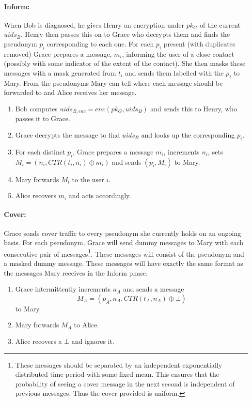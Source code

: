 \documentclass{article}
\begin{document}
\paragraph{Inform:}
When Bob is diagnosed, he gives Henry an encryption under $pk_G$ of the current $uids_B$. Henry then passes this on to Grace who decrypts them and finds the pseudonym $p_i$ corresponding to each one. For each $p_i$ present (with duplicates removed) Grace prepares a message, $m_i$, informing the user of a close contact (possibly with some indicator of the extent of the contact). She then masks these messages with a mask generated from $t_i$ and sends them labelled with the $p_i$ to Mary. From the pseudonyms Mary can tell where each message should be forwarded to and Alice receives her message.

\begin{enumerate}
    \item Bob computes $uids_{B, enc} = enc(pk_G, uids_B)$ and sends this to Henry, who passes it to Grace.
    \item Grace decrypts the message to find $uids_B$ and looks up the corresponding $p_i$.
    \item For each distinct $p_i$, Grace prepares a message $m_i$, increments $n_i$, sets $M_i = (n_i, \mathit{CTR}(t_i,n_i) \oplus m_i)$ and sends $(p_i,M_i)$ to Mary.
    \item Mary forwards $M_i$ to the user $i$.
    \item Alice recovers $m_i$ and acts accordingly.
\end{enumerate}

\paragraph{Cover:}
Grace sends cover traffic to every pseudonym she currently holds on an ongoing basis. For each pseudonym, Grace will send dummy messages to Mary with each consecutive pair of messages\footnote{These messages should be separated by an independent exponentially distributed time period with some fixed mean. This ensures that the probability of seeing a cover message in the next second is independent of previous messages. Thus the cover provided is uniform.}. These messages will consist of the pseudonym and a masked dummy message. These messages will have exactly the same format as the messages Mary receives in the Inform phase.

\begin{enumerate}
    \item Grace intermittently increments $n_A$ and sends a message $$M_A=(p_A,n_A,\mathit{CTR}(t_A,n_A)\oplus \bot)$$ to Mary.
    \item Mary forwards $M_A$ to Alice.
    \item Alice recovers a $\bot$ and ignores it.
\end{enumerate}
\end{document}
